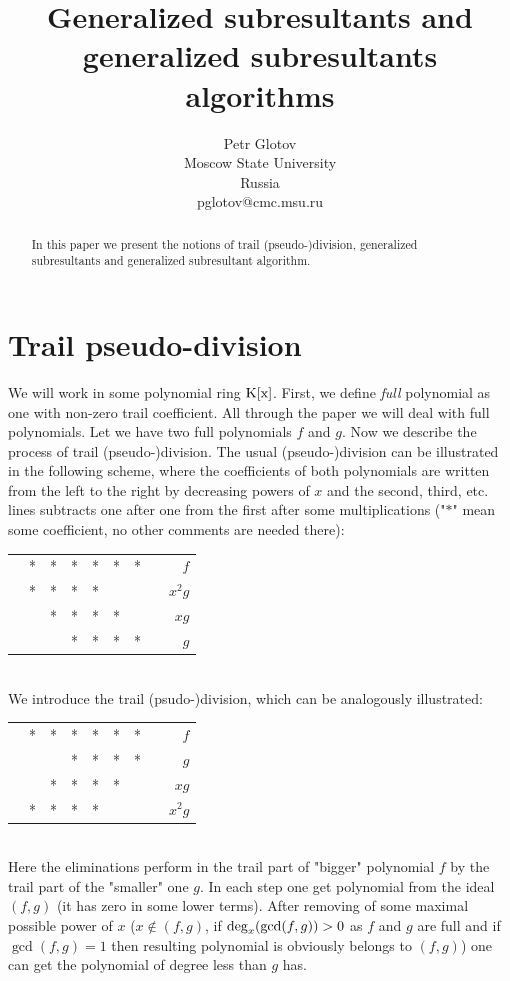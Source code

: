 \documentclass[12pt,fullpage]{article}
\newcommand{\K}{\rm K}
\newcommand{\dg}{{\rm deg}_x}
\begin{document}
\title{Generalized subresultants and generalized subresultants algorithms}
\author{Petr Glotov\\Moscow State University\\
                       Russia\\
                        pglotov@cmc.msu.ru}
\date{}
\maketitle
\begin{abstract}
In this paper we present the notions of trail (pseudo-)division, 
generalized subresultants and generalized subresultant algorithm.
\end{abstract}

\section{Trail pseudo-division}
We will work in some polynomial ring $\K[x]$.
First, we define {\it full} polynomial as one with non-zero trail coefficient.
All through the paper we will deal with full polynomials. Let we have two
full polynomials $f$ and $g$.
Now we describe the process of trail (pseudo-)division.
The usual (pseudo-)division can be illustrated in the following scheme,
where the coefficients of both polynomials are written from the left to the right by decreasing
powers of $x$ and
the second, third, etc. lines subtracts one after one from the first 
after some multiplications ("$*$" mean some coefficient, no other comments are 
needed there):\\
\begin{tabular}{ccccccccr}
&*&*&*&*&*&*& & $f$\\
&*&*&*&*& & & & $x^2g$\\
&~&*&*&*&*& & & $xg$\\
&~&~&*&*&*&*
& & $g$
\end{tabular}\\
We introduce the trail (psudo-)division, which
can be analogously illustrated:\\
\begin{tabular}{ccccccccr}
&*&*&*&*&*&*& & $f$\\
& & &*&*&*&*& & $g$\\
& &*&*&*&*& & & $xg$\\
&*&*&*&*
& & & & $x^2g$
\end{tabular}\\
Here the eliminations perform in the trail part of "bigger" polynomial $f$ by
the trail part of the "smaller" one $g$.
In each step one get polynomial from the ideal $(f,g)$ (it has zero in some
lower terms).
After removing of some maximal possible power of $x$
($x \notin (f,g)$, if $\dg(\gcd(f,g))>0$ as $f$ and $g$ are full
and if $\gcd(f,g)=1$ then resulting polynomial is obviously belongs to $(f,g)$)
one can get the polynomial of degree less than $g$ has.
\end{document}
